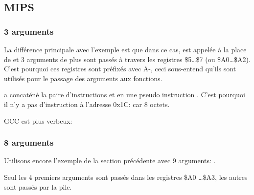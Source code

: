 \subsection{MIPS}

\subsubsection{3 arguments}


La différence principale avec l'exemple \q{\HelloWorldSectionName} est que dans ce cas, \printf est appelée
à la place de \puts et 3 arguments de plus sont passés à travers les registres \$5\dots \$7 (ou \$A0\dots \$A2).
C'est pourquoi ces registres sont préfixés avec A-, ceci sous-entend qu'ils
sont utilisés pour le passage des arguments aux fonctions.





\IDA a concaténé la paire d'instructions  et  en une pseudo instruction .
C'est pourquoi il n'y a pas d'instruction à l'adresse 0x1C: car   8 octets.


GCC \NonOptimizing est plus verbeux:





\subsubsection{8 arguments}

Utilisons encore l'exemple de la section précédente avec 9 arguments: .




Seul les 4 premiers arguments sont passés dans les registres \$A0 \dots \$A3,
les autres sont passés par la pile.

